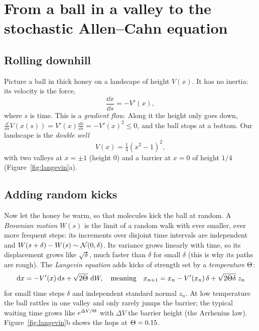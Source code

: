 \section{From a ball in a valley to the stochastic Allen--Cahn equation}\label{sec:allencahn}

\subsection{Rolling downhill}\label{sec:langevin}

Picture a ball in thick honey on a landscape of height $V(x)$. It has no inertia: its velocity is the force,
\begin{equation}\label{eq:gradflow}
  \frac{\dd x}{\dd s}=-V'(x),
\end{equation}
where $s$ is time. This is a \emph{gradient flow}. Along it the height only goes down,
$\frac{\dd}{\dd s}V(x(s))=V'(x)\frac{\dd x}{\dd s}=-V'(x)^2\le0$, and the ball stops at a bottom. Our landscape is the
\emph{double well}
\begin{equation}\label{eq:doublewell}
  V(x)=\tfrac14(x^2-1)^2,
\end{equation}
with two valleys at $x=\pm1$ (height $0$) and a barrier at $x=0$ of height $1/4$ (Figure~\ref{fig:langevin}a).

\subsection{Adding random kicks}

Now let the honey be warm, so that molecules kick the ball at random. A \emph{Brownian motion} $W(s)$ is the
limit of a random walk with ever smaller, ever more frequent steps: its increments over disjoint time
intervals are independent and $W(s+\delta)-W(s)\sim\mathcal{N}(0,\delta)$. Its variance grows linearly with time, so its
displacement grows like $\sqrt\delta$, much faster than $\delta$ for small $\delta$ (this is why its paths are rough).
The \emph{Langevin equation} adds kicks of strength set by a \emph{temperature} $\Theta$:
\begin{equation}\label{eq:langevin}
  \,\mathrm{d} x=-V'(x)\,\mathrm{d} s+\sqrt{2\Theta}\,\,\mathrm{d} W,\quad\text{meaning}\quad x_{n+1}=x_n-V'(x_n)\,\delta+\sqrt{2\Theta\delta}\;z_n
\end{equation}
for small time steps $\delta$ and independent standard normal $z_n$. At low temperature the ball rattles in one
valley and only rarely jumps the barrier; the typical waiting time grows like $e^{\Delta V/\Theta}$ with $\Delta V$ the
barrier height (the Arrhenius law). Figure~\ref{fig:langevin}b shows the hops at $\Theta=0.15$.

